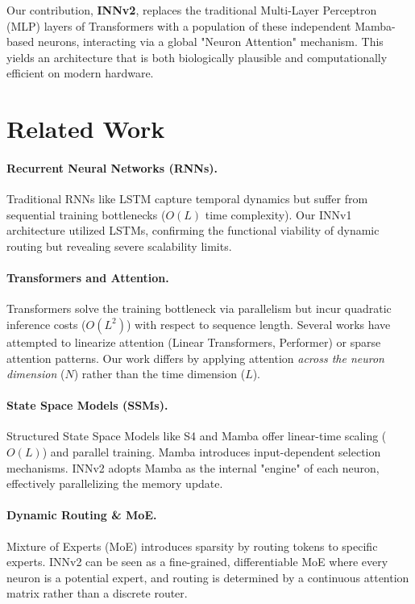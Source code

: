 \documentclass[a4paper,11pt]{article}
\begin{document}
Our contribution, \textbf{INNv2}, replaces the traditional Multi-Layer Perceptron (MLP) layers of Transformers with a population of these independent Mamba-based neurons, interacting via a global "Neuron Attention" mechanism. This yields an architecture that is both biologically plausible and computationally efficient on modern hardware.

\section{Related Work}

\paragraph{Recurrent Neural Networks (RNNs).}
Traditional RNNs like LSTM \citep{hochreiter1997long} capture temporal dynamics but suffer from sequential training bottlenecks ($O(L)$ time complexity). Our INNv1 architecture utilized LSTMs, confirming the functional viability of dynamic routing but revealing severe scalability limits.

\paragraph{Transformers and Attention.}
Transformers solve the training bottleneck via parallelism but incur quadratic inference costs ($O(L^2)$) with respect to sequence length. Several works have attempted to linearize attention (Linear Transformers, Performer) or sparse attention patterns. Our work differs by applying attention \textit{across the neuron dimension} ($N$) rather than the time dimension ($L$).

\paragraph{State Space Models (SSMs).}
Structured State Space Models like S4 \citep{gu2021efficiently} and Mamba \citep{gu2023mamba} offer linear-time scaling ($O(L)$) and parallel training. Mamba introduces input-dependent selection mechanisms. INNv2 adopts Mamba as the internal "engine" of each neuron, effectively parallelizing the memory update.

\paragraph{Dynamic Routing & MoE.}
Mixture of Experts (MoE) \citep{shazeer2017outrageously} introduces sparsity by routing tokens to specific experts. INNv2 can be seen as a fine-grained, differentiable MoE where every neuron is a potential expert, and routing is determined by a continuous attention matrix rather than a discrete router.
\end{document}
